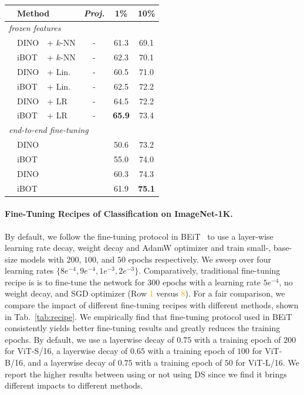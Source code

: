 \documentclass{article} %
\newcommand{\cmark}{\ding{51}}%
\newcommand{\xmark}{\ding{55}}%
\newcounter{rownumbers}
\newcommand\rownumber{\stepcounter{rownumbers}\arabic{rownumbers}}
\def\ourmethod{{iBOT}\xspace}
\begin{document}
\begin{table}[htb]
\begin{minipage}[r]{.45\linewidth}
{{\begin{tabular}{lllccc}
& \multicolumn{2}{l}{Method} & \textit{Proj.} & 1\% & 10\% \\
\toprule
\multicolumn{6}{l}{\textit{frozen features}} \\
\textcolor{orange}{\rownumber} & DINO & + $k$-NN & - & 61.3 & 69.1 \\
\textcolor{orange}{\rownumber} & \ourmethod & + $k$-NN & - & 62.3 & 70.1 \\
\textcolor{orange}{\rownumber} & DINO & + Lin. & - & 60.5 & 71.0 \\
\textcolor{orange}{\rownumber} & \ourmethod & + Lin. & - & 62.5 & 72.2 \\
\textcolor{orange}{\rownumber} & DINO & + LR & - & 64.5 & 72.2 \\
\textcolor{orange}{\rownumber} & \ourmethod & + LR & - & \bf 65.9 & 73.4 \\
\midrule
\multicolumn{6}{l}{\textit{end-to-end fine-tuning}} \\
\textcolor{orange}{\rownumber} & \multicolumn{2}{l}{DINO} & \xmark & 50.6 & 73.2 \\
\textcolor{orange}{\rownumber} & \multicolumn{2}{l}{\ourmethod} & \xmark & 55.0 & 74.0 \\
\textcolor{orange}{\rownumber} & \multicolumn{2}{l}{DINO} & \cmark & 60.3 & 74.3 \\
\textcolor{orange}{\rownumber} & \multicolumn{2}{l}{\ourmethod} & \cmark & 61.9 & \bf 75.1 \\
\bottomrule
\end{tabular}}}
\end{minipage}
\end{table}

\paragraph{Fine-Tuning Recipes of Classification on ImageNet-1K.} 
By default, we follow the fine-tuning protocol in BEiT~\citep{beit} to use a layer-wise learning rate decay, weight decay and AdamW optimizer and train small-, base-size models with $200$, $100$, and $50$ epochs respectively. We sweep over four learning rates $\{8e^{-4},9e^{-4},1e^{-3}, 2e^{-3}\}$.
Comparatively, traditional fine-tuning recipe is is to fine-tune the network for $300$ epochs with a learning rate $5e^{-4}$, no weight decay, and SGD optimizer \citep{deit} (Row \textcolor{orange}{1} versus \textcolor{orange}{8}).
For a fair comparison, we compare the impact of different fine-tuning recipes with different methods, shown in Tab.~\ref{tab:recipe}. 
We empirically find that fine-tuning protocol used in BEiT consistently yields better fine-tuning results and greatly reduces the training epochs. By default, we use a layerwise decay of $0.75$ with a training epoch of $200$ for ViT-S/16, a layerwise decay of $0.65$ with a training epoch of $100$ for ViT-B/16, and a layerwise decay of $0.75$ with a training epoch of $50$ for ViT-L/16.
We report the higher results between using or not using DS since we find it brings different impacts to different methods.
\end{document}
